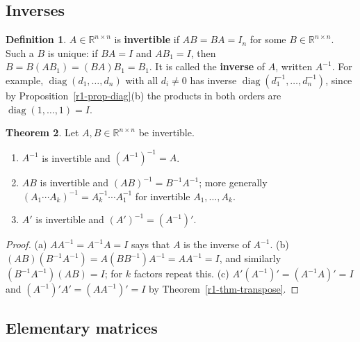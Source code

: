 \documentclass[12pt]{article}
\newcommand{\R}{\mathbb R}
\DeclareMathOperator{\diag}{diag}
\theoremstyle{definition}
\newtheorem{theorem}{Theorem}
\newtheorem{definition}[theorem]{Definition}
\begin{document}
\subsection*{Inverses}

\begin{definition}\label{r2-def-inverse}
\(A\in\R^{n\times n}\) is \textbf{invertible} if \(AB=BA=I_n\) for some
\(B\in\R^{n\times n}\). Such a \(B\) is unique: if \(BA=I\) and \(AB_1=I\), then
\(B=B(AB_1)=(BA)B_1=B_1\). It is called the \textbf{inverse} of \(A\), written \(A^{-1}\). For
example, \(\diag(d_1,\dots,d_n)\) with all \(d_i\ne0\) has inverse
\(\diag(d_1^{-1},\dots,d_n^{-1})\), since by Proposition~\ref{r1-prop-diag}(b) the products in both orders are
\(\diag(1,\dots,1)=I\).
\end{definition}

\begin{theorem}\label{r2-thm-inverse-props}
Let \(A,B\in\R^{n\times n}\) be invertible.
\begin{enumerate}
\item \(A^{-1}\) is invertible and \((A^{-1})^{-1}=A\).
\item \(AB\) is invertible and \((AB)^{-1}=B^{-1}A^{-1}\); more generally
\((A_1\cdots A_k)^{-1}=A_k^{-1}\cdots A_1^{-1}\) for invertible \(A_1,\dots,A_k\).
\item \(A'\) is invertible and \((A')^{-1}=(A^{-1})'\).
\end{enumerate}
\end{theorem}
\begin{proof}
(a) \(AA^{-1}=A^{-1}A=I\) says that \(A\) is the inverse of \(A^{-1}\). (b)
\((AB)(B^{-1}A^{-1})=A(BB^{-1})A^{-1}=AA^{-1}=I\), and similarly
\((B^{-1}A^{-1})(AB)=I\); for \(k\) factors repeat this. (c)
\(A'(A^{-1})'=(A^{-1}A)'=I\) and \((A^{-1})'A'=(AA^{-1})'=I\) by
Theorem~\ref{r1-thm-transpose}.
\end{proof}

\subsection*{Elementary matrices}
\end{document}
